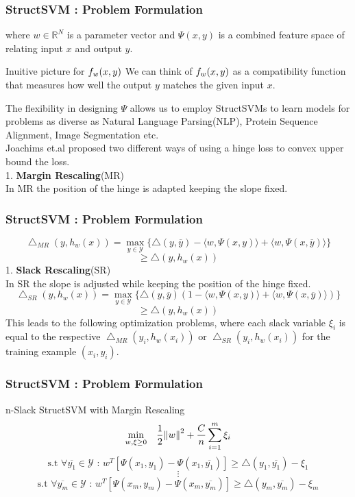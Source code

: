 \documentclass{beamer}
\begin{document}
\begin{frame}
\frametitle{StructSVM : Problem Formulation}
where $w \in \mathbb{R}^N$ is a parameter vector and $\Psi(x,y)$ is a combined feature space of relating input $x$ and output $y$.
\begin{block}{Inuitive picture for $\mathnormal{f}_w(x,y)$}
We can think of $\mathnormal{f}_w(x,y)$ as a compatibility function that measures how well the output $y$ matches the given input $x$.
\end{block}
The flexibility in designing $\Psi$ allows us to employ StructSVMs to learn models for problems as diverse as Natural Language Parsing(NLP), Protein Sequence Alignment, Image Segmentation etc.\\
Joachims et.al proposed two different ways of using a hinge loss to convex upper bound the loss.\\
1. \textbf{Margin Rescaling}(MR)\\
In MR the position of the hinge is adapted keeping the slope fixed. 
\end{frame}

\begin{frame}
\frametitle{StructSVM : Problem Formulation}
\[ \bigtriangleup_{MR}(y, h_w(x)) =  \underset{y \in \mathcal{Y}}{\max}\{ \bigtriangleup(y, \overline{y}) - \langle w , \Psi(x,y) \rangle + \langle w , \Psi(x,\overline{y}) \rangle \} \]
\[ \geq \bigtriangleup(y, h_w(x)) \]
1. \textbf{Slack Rescaling}(SR)\\
In SR the slope is adjusted while keeping the position of the hinge fixed.
\[ \bigtriangleup_{SR}(y, h_w(x)) =  \underset{y \in \mathcal{Y}}{\max}\{ \bigtriangleup(y, \overline{y})(1 - \langle w , \Psi(x,y) \rangle + \langle w , \Psi(x,\overline{y}) \rangle) \} \]
\[ \geq \bigtriangleup(y, h_w(x)) \]
This leads to the following optimization problems, where each slack variable $\xi_i$ is equal to the respective $\bigtriangleup_{MR}(y_i, h_w(x_i))$ or $\bigtriangleup_{SR}(y_i, h_w(x_i))$ for the training example $(x_i, y_i)$.
\end{frame}


\begin{frame}
\frametitle{StructSVM : Problem Formulation}
\begin{block}{n-Slack StructSVM with Margin Rescaling}
\[\underset{w, \xi \geq 0}{\min} \quad \frac{1}{2} \norm{w}^2 + \frac{C}{n} \sum_{i=1}^m \xi_i \]
\[ \textrm{s.t } \forall \overline{y_1} \in \mathcal{Y} \textrm{  :  } w^T[\Psi(x_1, y_1) - \Psi(x_1, \overline{y_1})] \geq \bigtriangleup(y_1, \overline{y_1}) - \xi_1 \]
\[ \vdots \]
\[ \textrm{s.t } \forall \overline{y_m} \in \mathcal{Y} \textrm{  :  } w^T[\Psi(x_m, y_m) - \Psi(x_m, \overline{y_m})] \geq \bigtriangleup(y_m, \overline{y_m}) - \xi_m \]
\end{block}

\end{frame}
\end{document}
